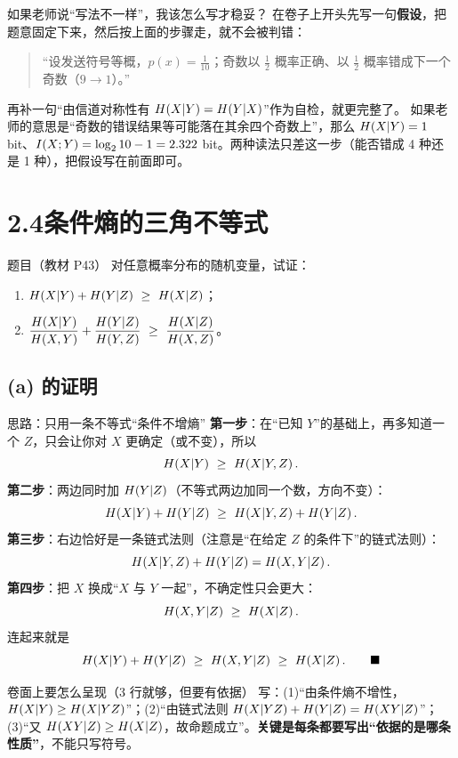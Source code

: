 \documentclass[11pt,a4paper]{ctexart}
\begin{document}
\begin{qa}{如果老师说“写法不一样”，我该怎么写才稳妥？}
在卷子上开头先写一句\textbf{假设}，把题意固定下来，然后按上面的步骤走，就不会被判错：
\begin{quote}
“设发送符号等概，$p(x)=\frac1{10}$；奇数以 $\frac12$ 概率正确、以 $\frac12$ 概率错成下一个奇数（$9\to1$）。”
\end{quote}
再补一句“由信道对称性有 $H\!\left(X|Y\right)=H\!\left(Y|X\right)$”作为自检，就更完整了。
如果老师的意思是“奇数的错误结果等可能落在其余四个奇数上”，那么 $H\!\left(X|Y\right)=1$ bit、$I\!\left(X;Y\right)=\log_{2}10-1=2.322$ bit。两种读法只差这一步（能否错成 4 种还是 1 种），把假设写在前面即可。
\end{qa}

\section{2.4\quad 条件熵的三角不等式}

\begin{defbox}{题目（教材 P43）}
对任意概率分布的随机变量，试证：
\begin{enumerate}[label=(\alph*),leftmargin=1.8em,itemsep=1pt,topsep=2pt]
  \item $\Hx{X|Y}+\Hx{Y|Z}\ \ge\ \Hx{X|Z}$；
  \item $\dfrac{\Hx{X|Y}}{\Hx{X,Y}}+\dfrac{\Hx{Y|Z}}{\Hx{Y,Z}}\ \ge\ \dfrac{\Hx{X|Z}}{\Hx{X,Z}}$。
\end{enumerate}
\end{defbox}

\subsection{(a) 的证明}

\begin{calc}{思路：只用一条不等式“条件不增熵”}
\textbf{第一步}：在“已知 $Y$”的基础上，再多知道一个 $Z$，只会让你对 $X$ 更确定（或不变），所以
\[
\Hx{X|Y}\ \ge\ \Hx{X|Y,Z}.
\]
\textbf{第二步}：两边同时加 $H\!\left(Y|Z\right)$（不等式两边加同一个数，方向不变）：
\[
\Hx{X|Y}+\Hx{Y|Z}\ \ge\ \Hx{X|Y,Z}+\Hx{Y|Z}.
\]
\textbf{第三步}：右边恰好是一条链式法则（注意是“在给定 $Z$ 的条件下”的链式法则）：
\[
H\!\left(X|Y,Z\right)+H\!\left(Y|Z\right)=H\!\left(X,Y|Z\right).
\]
\textbf{第四步}：把 $X$ 换成“$X$ 与 $Y$ 一起”，不确定性只会更大：
\[
\Hx{X,Y|Z}\ \ge\ \Hx{X|Z}.
\]
连起来就是
\[
\Hx{X|Y}+\Hx{Y|Z}\ \ge\ \Hx{X,Y|Z}\ \ge\ \Hx{X|Z}.\qquad\blacksquare
\]
\end{calc}

\begin{exam}{卷面上要怎么呈现（3 行就够，但要有依据）}
写：(1)“由条件熵不增性，$H\!\left(X|Y\right)\ge H\!\left(X|YZ\right)$”；(2)“由链式法则 $H\!\left(X|YZ\right)+H\!\left(Y|Z\right)=H\!\left(XY|Z\right)$”；
(3)“又 $H\!\left(XY|Z\right)\ge H\!\left(X|Z\right)$，故命题成立”。\textbf{关键是每条都要写出“依据的是哪条性质”}，不能只写符号。
\end{exam}
\end{document}
